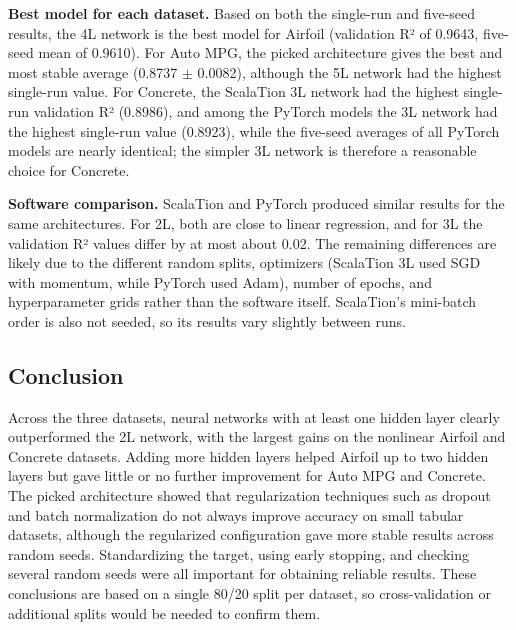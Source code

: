 \documentclass{article}
\begin{document}
\textbf{Best model for each dataset.} Based on both the single-run and five-seed results, the 4L network is the best model for Airfoil (validation R² of 0.9643, five-seed mean of 0.9610). For Auto MPG, the picked architecture gives the best and most stable average (0.8737 $\pm$ 0.0082), although the 5L network had the highest single-run value. For Concrete, the ScalaTion 3L network had the highest single-run validation R² (0.8986), and among the PyTorch models the 3L network had the highest single-run value (0.8923), while the five-seed averages of all PyTorch models are nearly identical; the simpler 3L network is therefore a reasonable choice for Concrete.
\medskip

\textbf{Software comparison.} ScalaTion and PyTorch produced similar results for the same architectures. For 2L, both are close to linear regression, and for 3L the validation R² values differ by at most about 0.02. The remaining differences are likely due to the different random splits, optimizers (ScalaTion 3L used SGD with momentum, while PyTorch used Adam), number of epochs, and hyperparameter grids rather than the software itself. ScalaTion's mini-batch order is also not seeded, so its results vary slightly between runs.

\subsection{Conclusion}
Across the three datasets, neural networks with at least one hidden layer clearly outperformed the 2L network, with the largest gains on the nonlinear Airfoil and Concrete datasets. Adding more hidden layers helped Airfoil up to two hidden layers but gave little or no further improvement for Auto MPG and Concrete. The picked architecture showed that regularization techniques such as dropout and batch normalization do not always improve accuracy on small tabular datasets, although the regularized configuration gave more stable results across random seeds. Standardizing the target, using early stopping, and checking several random seeds were all important for obtaining reliable results. These conclusions are based on a single 80/20 split per dataset, so cross-validation or additional splits would be needed to confirm them.
\end{document}
